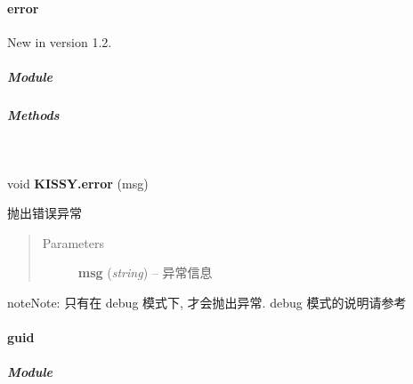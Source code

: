 \documentclass[letterpaper,10pt,english]{sphinxmanual}
\begin{document}
\paragraph{error}
\label{api/seed/kissy/error::doc}\label{api/seed/kissy/error:error}New in version 1.2.

\subparagraph{Module}
\label{api/seed/kissy/error:module}\begin{quote}

{\hyperref[api/seed/kissy/index:module-Seed]{}}
\end{quote}


\subparagraph{Methods}
\label{api/seed/kissy/error:methods}

\begin{fulllineitems}
\label{api/seed/kissy/error:Seed.KISSY.error}~
\begin{DUlineblock}{0em}
\item[] void \textbf{KISSY.error} (msg)
\item[] 抛出错误异常
\end{DUlineblock}
\begin{quote}\begin{description}
\item[{Parameters}] \leavevmode
\textbf{msg} (\emph{string}) -- 异常信息

\end{description}\end{quote}

\begin{notice}{note}{Note:}
只有在 debug 模式下, 才会抛出异常. debug 模式的说明请参考 {\hyperref[api/seed/kissy/Config:Seed.KISSY.Config]{}}
\end{notice}

\end{fulllineitems}



\paragraph{guid}
\label{api/seed/kissy/guid:guid}\label{api/seed/kissy/guid::doc}

\subparagraph{Module}
\label{api/seed/kissy/guid:module}\begin{quote}

{\hyperref[api/seed/kissy/index:module-Seed]{}}
\end{quote}
\end{document}
